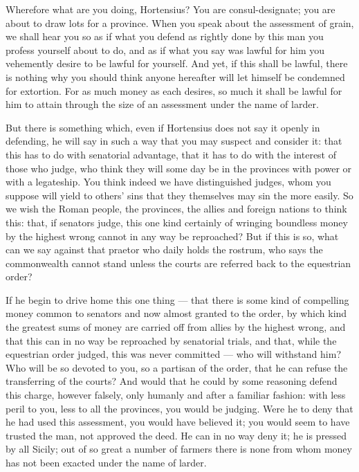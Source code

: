 Wherefore what are you doing, Hortensius? You are consul-designate; you are about to draw lots for a province. When you speak about the assessment of grain, we shall hear you so as if what you defend as rightly done by this man you profess yourself about to do, and as if what you say was lawful for him you vehemently desire to be lawful for yourself. And yet, if this shall be lawful, there is nothing why you should think anyone hereafter will let himself be condemned for extortion. For as much money as each desires, so much it shall be lawful for him to attain through the size of an assessment under the name of larder.

 But there is something which, even if Hortensius does not say it openly in defending, he will say in such a way that you may suspect and consider it: that this has to do with senatorial advantage, that it has to do with the interest of those who judge, who think they will some day be in the provinces with power or with a legateship. You think indeed we have distinguished judges, whom you suppose will yield to others' sins that they themselves may sin the more easily. So we wish the Roman people, the provinces, the allies and foreign nations to think this: that, if senators judge, this one kind certainly of wringing boundless money by the highest wrong cannot in any way be reproached? But if this is so, what can we say against that praetor who daily holds the rostrum, who says the commonwealth cannot stand unless the courts are referred back to the equestrian order?

 If he begin to drive home this one thing --- that there is some kind of compelling money common to senators and now almost granted to the order, by which kind the greatest sums of money are carried off from allies by the highest wrong, and that this can in no way be reproached by senatorial trials, and that, while the equestrian order judged, this was never committed --- who will withstand him? Who will be so devoted to you, so a partisan of the order, that he can refuse the transferring of the courts? And would that he could by some reasoning defend this charge, however falsely, only humanly and after a familiar fashion: with less peril to you, less to all the provinces, you would be judging. Were he to deny that he had used this assessment, you would have believed it; you would seem to have trusted the man, not approved the deed. He can in no way deny it; he is pressed by all Sicily; out of so great a number of farmers there is none from whom money has not been exacted under the name of larder.

